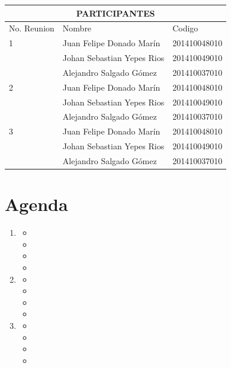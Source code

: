 \documentclass{article}
\begin{document}
    \begin{tabularx}{\textwidth}{ |X|X|X| }
        \hline
        \multicolumn{3}{|c|}{\cellcolor{blue} PARTICIPANTES} \\
        \hline
        No. Reunion & Nombre & Codigo \\
        \hline
        1 & Juan Felipe Donado Mar\'in & 201410048010 \\
         & Johan Sebastian Yepes Rios & 201410049010 \\
         & Alejandro Salgado G\'omez & 201410037010 \\ 
        \hline
        2 & Juan Felipe Donado Mar\'in & 201410048010 \\
         & Johan Sebastian Yepes Rios & 201410049010 \\
         & Alejandro Salgado G\'omez & 201410037010 \\ 
        \hline
        3 & Juan Felipe Donado Mar\'in & 201410048010 \\
         & Johan Sebastian Yepes Rios & 201410049010 \\
         & Alejandro Salgado G\'omez & 201410037010 \\ 
        \hline

    \end{tabularx}

    \vspace{1cm}

    \section*{Agenda}
        \begin{enumerate}
            \item
            \begin{itemize}
                \item 
                \item 
                \item 
                \item 
            \end{itemize}
            \item
            \begin{itemize}
                \item 
                \item 
                \item 
                \item 
            \end{itemize}
            \item 
            \begin{itemize}
                \item 
                \item 
                \item 
                \item 
            \end{itemize}
        \end{enumerate}
\end{document}
